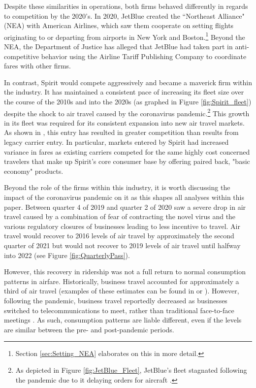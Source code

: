 \documentclass{article}
\begin{document}
	Despite these similarities in operations, both firms behaved differently in regards to competition by the 2020's.  In 2020, JetBlue created the ``Northeast Alliance" (NEA) with American Airlines, which saw them cooperate on setting flights originating to or departing from airports in New York and Boston.\footnote{Section \ref{sec:Setting_NEA} elaborates on this in more detail.} Beyond the NEA, the Department of Justice has alleged that JetBlue had taken part in anti-competitive behavior using the Airline Tariff Publishing Company to coordinate fares with other firms. 
	
	In contrast, Spirit would compete aggressively and became a maverick firm within the industry. It has maintained a consistent pace of increasing its fleet size over the course of the 2010s and into the 2020s (as graphed in Figure \ref{fig:Spirit_fleet}) despite the shock to air travel caused by the coronavirus pandemic.\footnote{As depicted in Figure \ref{fig:JetBlue_Fleet}, JetBlue's fleet stagnated following the pandemic due to it delaying orders for aircraft \citep{bellamy_iii_jetblue_2020, sipinski_jetblue_2020}.} This growth in its fleet was required for its consistent expansion into new air travel markets. As shown in \citet{shrago_spirit_2024}, this entry has resulted in greater competition than results from legacy carrier entry. In particular, markets entered by Spirit had increased variance in fares as existing carriers competed for the same highly cost concerned travelers that make up Spirit's core consumer base by offering paired back, "basic economy" products.
	
	Beyond the role of the firms within this industry, it is worth discussing the impact of the coronavirus pandemic on it as this shapes all analyses within this paper.  Between quarter 4 of 2019 and quarter 2 of 2020 saw a severe drop in air travel caused by a combination of fear of contracting the novel virus and the various regulatory closures of businesses leading to less incentive to travel. Air travel would recover to 2016 levels of air travel by approximately the second quarter of 2021 but would not recover to 2019 levels of air travel until halfway into 2022 (see Figure \ref{fig:QuarterlyPass}). 
	
	However, this recovery in ridership was not a full return to normal consumption patterns in airfare. Historically, business travel accounted for approximately a third of air travel (examples of these estimates can be found in \citet{berry_tracing_2010} or \citet{bet_market_2021}). However, following the pandemic, business travel reportedly decreased as businesses switched to telecommunications to meet, rather than traditional face-to-face meetings \citep{semuels_business_2021}. As such, consumption patterns are liable different, even if the levels are similar between the pre- and post-pandemic periods. 
	
\end{document}
